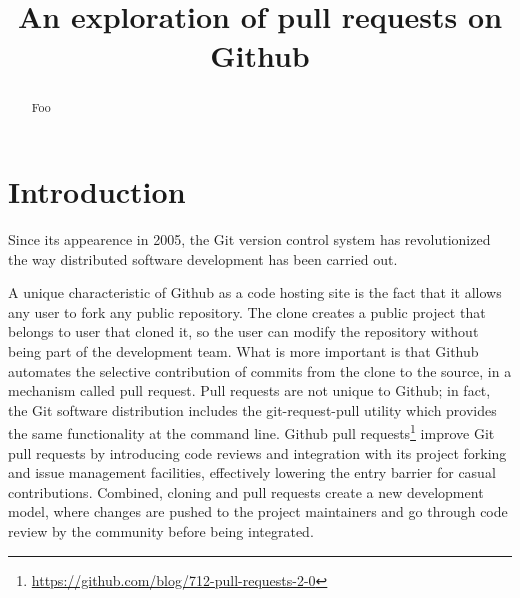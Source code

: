 \documentclass[conference]{IEEEtran}
\begin{document}
\title{An exploration of pull requests on Github}

\author{
}

\maketitle

\begin{abstract}
Foo
\end{abstract}

\begin{IEEEkeywords}

\end{IEEEkeywords}

\section{Introduction}

Since its appearence in 2005, the Git version control system has 
revolutionized the way distributed software development has been
carried out. 

A unique characteristic of Github as a code hosting site is the fact that it
allows any user to fork any public repository.  The clone creates a public
project that belongs to user that cloned it, so the user can modify the
repository without being part of the development team. What is more important is
that Github automates the selective contribution of commits from the clone to
the source, in a mechanism called pull request.  Pull requests are not unique to
Github; in fact, the Git software distribution includes the
\textsf{git-request-pull} utility which provides the same functionality at the
command line. Github pull
requests\footnote{\url{https://github.com/blog/712-pull-requests-2-0}} improve
Git pull requests by introducing code reviews and integration with its project
forking and issue management facilities, effectively lowering the entry barrier
for casual contributions. Combined, cloning and pull requests create a new
development model, where changes are pushed to the project maintainers and go
through code review by the community before being integrated. 
\end{document}

